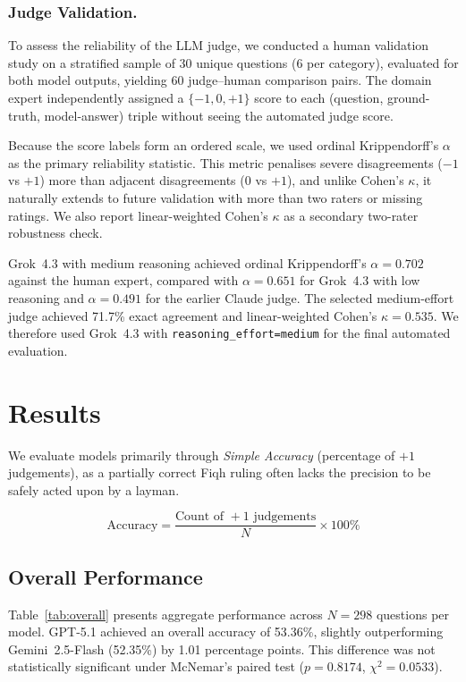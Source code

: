 \documentclass[runningheads]{llncs}
\begin{document}
\subsubsection{Judge Validation.}
\label{sec:judge-validation}
To assess the reliability of the LLM judge, we conducted a human validation study on a stratified sample of 30 unique questions (6 per category), evaluated for both model outputs, yielding 60 judge--human comparison pairs. The domain expert independently assigned a $\{-1, 0, +1\}$ score to each (question, ground-truth, model-answer) triple without seeing the automated judge score.

Because the score labels form an ordered scale, we used ordinal Krippendorff's $\alpha$ as the primary reliability statistic. This metric penalises severe disagreements ($-1$ vs $+1$) more than adjacent disagreements ($0$ vs $+1$), and unlike Cohen's $\kappa$, it naturally extends to future validation with more than two raters or missing ratings. We also report linear-weighted Cohen's $\kappa$ as a secondary two-rater robustness check.

Grok~4.3 with medium reasoning achieved ordinal Krippendorff's $\alpha = 0.702$ against the human expert, compared with $\alpha = 0.651$ for Grok~4.3 with low reasoning and $\alpha = 0.491$ for the earlier Claude judge. The selected medium-effort judge achieved 71.7\% exact agreement and linear-weighted Cohen's $\kappa = 0.535$. We therefore used Grok~4.3 with \texttt{reasoning\_effort=medium} for the final automated evaluation.

\section{Results}

We evaluate models primarily through \emph{Simple Accuracy} (percentage of $+1$ judgements), as a partially correct Fiqh ruling often lacks the precision to be safely acted upon by a layman.

\begin{equation}
\text{Accuracy} = \frac{\text{Count of }+1\text{ judgements}}{N} \times 100\%
\end{equation}

\subsection{Overall Performance}
Table~\ref{tab:overall} presents aggregate performance across $N=298$ questions per model. GPT-5.1 achieved an overall accuracy of 53.36\%, slightly outperforming Gemini~2.5-Flash (52.35\%) by 1.01 percentage points. This difference was not statistically significant under McNemar's paired test ($p = 0.8174$, $\chi^2 = 0.0533$).
\end{document}
